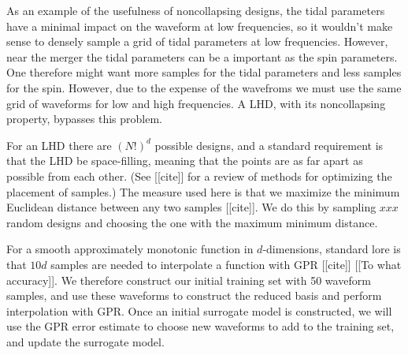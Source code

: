 \documentclass[prd,aps,letter,twocolumn,floatfix,notitlepage]{revtex4-1}
\begin{document}
As an example of the usefulness of noncollapsing designs, the tidal parameters have a minimal impact on the waveform
at low frequencies, so it wouldn't make sense to densely sample a grid of tidal parameters at low frequencies. However, near
the merger the tidal parameters can be a important as the spin parameters. One therefore might want more samples for the tidal
parameters and less samples for the spin. However, due to the expense of the wavefroms we must use the same grid of waveforms 
for low and high frequencies. A LHD, with its noncollapsing property, bypasses this problem. 

For an LHD there are $(N!)^d$ possible designs, and a standard requirement is that the LHD be space-filling, meaning that the 
points are as far apart as possible from each other. (See [[cite]] for a review of methods for optimizing the placement of samples.) 
The measure used here is that we maximize the minimum Euclidean distance between any two samples [[cite]]. We do this by 
sampling $xxx$ random designs and choosing the one with the maximum minimum distance.

For a smooth approximately monotonic function in $d$-dimensions, standard lore is that $10d$ samples are needed to interpolate 
a function with GPR [[cite]] [[To what accuracy]]. We therefore construct our initial training set with 50 waveform samples, and use 
these waveforms to construct the reduced basis and perform interpolation with GPR. Once an initial surrogate model is constructed,
we will use the GPR error estimate to choose new waveforms to add to the training set, and update the surrogate model.
\end{document}
